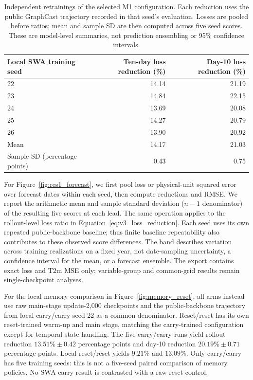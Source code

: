 \documentclass{article}
\newcommand{\vfourchange}[1]{{\color{blue}#1}}
\begin{document}
\begin{table}[!htbp]
    \centering
    \small
    \begingroup\color{blue}
    \begin{tabular}{lrr}
        \toprule
        Local SWA training seed & Ten-day loss reduction (\%) & Day-10 loss reduction (\%) \\
        \midrule
        22 & 14.14 & 21.19 \\
        23 & 14.84 & 22.15 \\
        24 & 13.69 & 20.08 \\
        25 & 14.27 & 20.79 \\
        26 & 13.90 & 20.92 \\
        \midrule
        Mean & 14.17 & 21.03 \\
        Sample SD (percentage points) & 0.43 & 0.75 \\
        \bottomrule
    \end{tabular}
    \endgroup
    \caption{\vfourchange{Independent retrainings of the selected M1 configuration. Each reduction uses the public GraphCast trajectory recorded in that seed's evaluation. Losses are pooled before ratios; mean and sample SD are then computed across five seed scores. These are model-level summaries, not prediction ensembling or 95\% confidence intervals.}}
    \label{tab:seed_replication}
\end{table}

\vfourchange{For Figure~\ref{fig:res1_forecast}, we first pool loss or physical-unit squared error over forecast dates within each seed, then compute reductions and RMSE. We report the arithmetic mean and sample standard deviation ($n-1$ denominator) of the resulting five scores at each lead. The same operation applies to the rollout-level loss ratio in Equation~\ref{eq:v3_loss_reduction}. Each seed uses its own repeated public-backbone baseline; thus finite baseline repeatability also contributes to these observed score differences. The band describes variation across training realizations on a fixed year, not date-sampling uncertainty, a confidence interval for the mean, or a forecast ensemble. The export contains exact loss and T2m MSE only; variable-group and common-grid results remain single-checkpoint analyses.}

\vfourchange{For the local memory comparison in Figure~\ref{fig:memory_reset}, all arms instead use raw main-stage update-2,000 checkpoints and the public-backbone trajectory from local carry/carry seed 22 as a common denominator. Reset/reset has its own reset-trained warm-up and main stage, matching the carry-trained configuration except for temporal-state handling. The five carry/carry runs yield rollout reduction $13.51\%\pm0.42$ percentage points and day-10 reduction $20.19\%\pm0.71$ percentage points. Local reset/reset yields $9.21\%$ and $13.09\%$. Only carry/carry has five training seeds: this is not a five-seed paired comparison of memory policies. No SWA carry result is contrasted with a raw reset control.}
\end{document}
